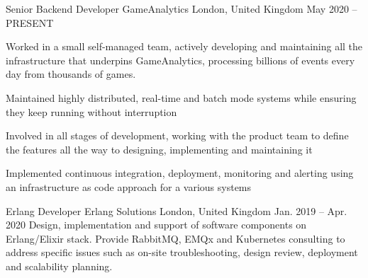 

\begin{cventries}

  \cventry
    {Senior Backend Developer} %
    {GameAnalytics} %
    {London, United Kingdom} %
    {May 2020 – PRESENT} %
    {
      \responsibilities
        {Worked in a small self-managed team, actively developing and
        maintaining all the infrastructure that underpins GameAnalytics,
        processing billions of events every day from thousands of games.}
        \begin{cvitems} %
          \item {Maintained highly distributed, real-time and batch mode systems while ensuring they keep running without interruption}
          \item {Involved in all stages of development, working with the product team to
                 define the features all the way to designing, implementing and
                 maintaining it}
          \columnbreak
          \item {Implemented continuous integration, deployment, monitoring and
                 alerting using an infrastructure as code approach for a various
                 systems}
        \end{cvitems}
    }

  \cventry
    {Erlang Developer} %
    {Erlang Solutions} %
    {London, United Kingdom} %
    {Jan. 2019 – Apr. 2020} %
    {
      \responsibilities
        {Design, implementation and support of software components
          on Erlang/Elixir stack. Provide RabbitMQ, EMQx and
          Kubernetes consulting to address specific issues such as on-site
          troubleshooting, design review, deployment and scalability
          planning.}
    }


\end{cventries}
